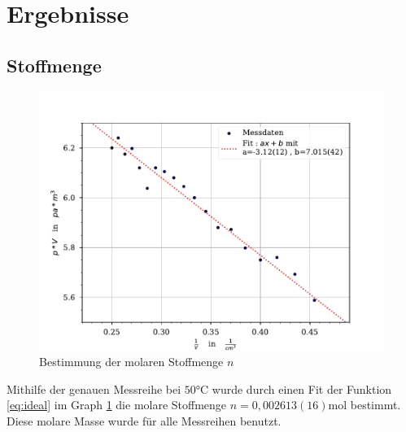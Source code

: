 \documentclass[11pt, a4paper]{article}
\begin{document}
    \section{Ergebnisse}
    \subsection{Stoffmenge}
    \begin{figure}
        \centering
        \includegraphics[width=\textwidth]{./Plots/3Plot_n.pdf}

        \caption{Bestimmung der molaren Stoffmenge $n$}
        \label{fig:n}
    \end{figure}
    
    Mithilfe der genauen Messreihe bei $50 \si{\celsius}$ wurde durch einen Fit der
    Funktion \ref{eq:ideal} im Graph \ref{fig:n} die molare Stoffmenge $n = 0,002613(16) \si{\mole}$ bestimmt.
    Diese molare Masse wurde für alle Messreihen benutzt.
\end{document}
